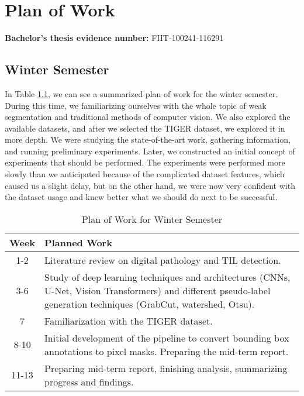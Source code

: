 \chapter{Plan of Work \label{appendix:plan} }
\renewcommand{\thepage}{A-\arabic{page}}
\setcounter{page}{1}

\textbf{Bachelor's thesis evidence number:} FIIT-100241-116291

\section{Winter Semester}
In Table \ref{tab:winter_plan}, we can see a summarized plan of work for the winter semester. During this time, we familiarizing ourselves with the whole topic of weak segmentation and traditional methods of computer vision. We also explored the available datasets, and after we selected the TIGER dataset, we explored it in more depth. We were studying the state-of-the-art work, gathering information, and running preliminary experiments. Later, we constructed an initial concept of experiments that should be performed. The experiments were performed more slowly than we anticipated because of the complicated dataset features, which caused us a slight delay, but on the other hand, we were now very confident with the dataset usage and knew better what we should do next to be successful.

\begin{table}[h!]
\centering
\caption{Plan of Work for Winter Semester}
\begin{tabular}{|c|p{12.5cm}|}
\hline
\textbf{Week} & \textbf{Planned Work} \\ 
\hline
\hline
1-2 & Literature review on digital pathology and TIL detection. \\ 
\hline
3-6 & Study of deep learning techniques and architectures (CNNs, U-Net, Vision Transformers) and different pseudo-label generation techniques (GrabCut, watershed, Otsu). \\
\hline
7 & Familiarization with the TIGER dataset. \\
\hline
8-10 & Initial development of the pipeline to convert bounding box annotations to pixel masks. Preparing the mid-term report. \\ 
\hline
11-13 & Preparing mid-term report, finishing analysis, summarizing progress and findings. \\ 
\hline
\end{tabular}
\label{tab:winter_plan}
\end{table}

